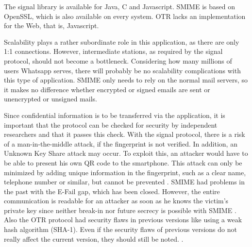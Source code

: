 \documentclass[12pt,oneside,a4paper,parskip]{scrbook}
\begin{document}
The signal library is available for Java, C and Javascript. SMIME is based on OpenSSL, which is also available on every system. OTR lacks an implementation for the Web, that is, Javascript.

Scalability plays a rather subordinate role in this application, as there are only 1:1 connections. However, intermediate stations, as required by the signal protocol, should not become a bottleneck. Considering how many millions of users Whatsapp serves, there will probably be no scalability complications with this type of application. SMIME only needs to rely on the normal mail servers, so it makes no difference whether encrypted or signed emails are sent or unencrypted or unsigned mails.

Since confidential information is to be transferred via the application, it is important that the protocol can be checked for security by independent researchers and that it passes this check.
With the signal protocol, there is a risk of a man-in-the-middle attack, if the fingerprint is not verified. In addition, an Unknown Key Share attack may occur. To exploit this, an attacker would have to be able to present his own QR code to the smartphone. This attack can only be minimized by adding unique information in the fingerprint, such as a clear name, telephone number or similar, but cannot be prevented \parencite{marlinspike_x3dh_2016}. \newline
SMIME had problems in the past with the E-Fail gap, which has been closed. However, the entire communication is readable for an attacker as soon as he knows the victim's private key since neither break-in nor future secrecy is possible with SMIME \parencite{bsi_bsi_nodate}. \newline
Also the OTR protocol had security flaws in previous versions like using a weak hash algorithm (SHA-1). Even if the security flaws of previous versions do not really affect the current version, they should still be noted. \parencite{bonneau_finite-state_nodate}.
\end{document}
